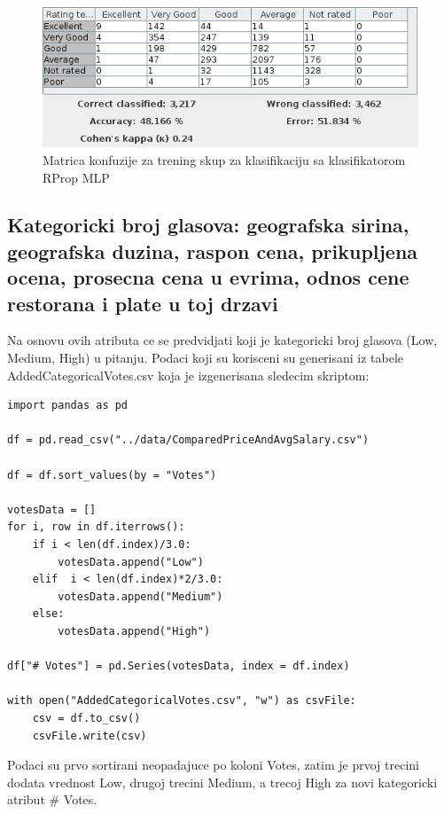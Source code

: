 \documentclass[11pt]{article} %
\begin{document}
\begin{figure}[h!]
	\centering
	\includegraphics[width=1.1\textwidth]{ratingClassificationTraining/RProp}
	\caption{Matrica konfuzije za trening skup za klasifikaciju sa klasifikatorom RProp MLP}
\end{figure}


\newpage
\subsection{Kategoricki broj glasova: geografska sirina, geografska duzina, raspon cena, prikupljena ocena, prosecna cena u evrima, 
odnos cene restorana i plate u toj drzavi}
Na osnovu ovih atributa ce se predvidjati koji je kategoricki broj glasova (Low, Medium, High) u pitanju. 
\newline 
Podaci koji su korisceni su generisani iz tabele AddedCategoricalVotes.csv koja je izgenerisana sledecim skriptom:


\begin{lstlisting}
import pandas as pd

df = pd.read_csv("../data/ComparedPriceAndAvgSalary.csv")

df = df.sort_values(by = "Votes")

votesData = []
for i, row in df.iterrows():
    if i < len(df.index)/3.0:
        votesData.append("Low")
    elif  i < len(df.index)*2/3.0:
        votesData.append("Medium")
    else:
        votesData.append("High")
        
df["# Votes"] = pd.Series(votesData, index = df.index)

with open("AddedCategoricalVotes.csv", "w") as csvFile:
    csv = df.to_csv()
    csvFile.write(csv)
\end{lstlisting}
Podaci su prvo sortirani neopadajuce po koloni Votes, zatim je prvoj trecini dodata vrednost Low, drugoj trecini Medium, a trecoj High za novi kategoricki 
atribut \# Votes.
\end{document}
